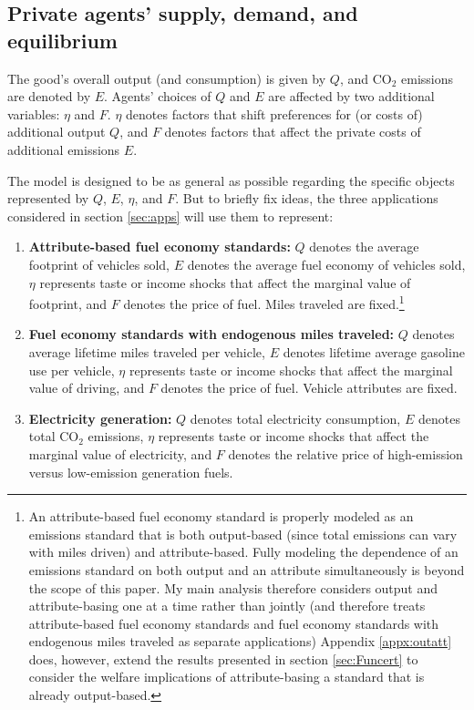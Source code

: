 \documentclass[12pt]{article}
\begin{document}
\subsection{Private agents' supply, demand, and equilibrium} \label{sec:private}

The good's overall output (and consumption) is given by $Q$, and CO$_{\text{2}}$ emissions are denoted by $E$. Agents' choices of $Q$ and $E$ are affected by two additional variables: $\eta$ and $F$. $\eta$ denotes factors that shift preferences for (or costs of) additional output $Q$, and $F$ denotes factors that affect the private costs of additional emissions $E$.

The model is designed to be as general as possible regarding the specific objects represented by $Q$, $E$, $\eta$, and $F$. But to briefly fix ideas, the three applications considered in section \ref{sec:apps} will use them to represent:
\begin{enumerate}
\item \textbf{Attribute-based fuel economy standards:} $Q$ denotes the average footprint of vehicles sold, $E$ denotes the average fuel economy of vehicles sold, $\eta$ represents taste or income shocks that affect the marginal value of footprint, and $F$ denotes the price of fuel. Miles traveled are fixed.\footnote{An attribute-based fuel economy standard is properly modeled as an emissions standard that is both output-based (since total emissions can vary with miles driven) and attribute-based. Fully modeling the dependence of an emissions standard on both output and an attribute simultaneously is beyond the scope of this paper. My main analysis therefore considers output and attribute-basing one at a time rather than jointly (and therefore treats attribute-based fuel economy standards and fuel economy standards with endogenous miles traveled as separate applications) Appendix \ref{appx:outatt} does, however, extend the results presented in section \ref{sec:Funcert} to consider the welfare implications of attribute-basing a standard that is already output-based.}
\item \textbf{Fuel economy standards with endogenous miles traveled:} $Q$ denotes average lifetime miles traveled per vehicle, $E$ denotes lifetime average gasoline use per vehicle, $\eta$ represents taste or income shocks that affect the marginal value of driving, and $F$ denotes the price of fuel. Vehicle attributes are fixed.
\item \textbf{Electricity generation:} $Q$ denotes total electricity consumption, $E$ denotes total CO$_{\text{2}}$ emissions, $\eta$ represents taste or income shocks that affect the marginal value of electricity, and $F$ denotes the relative price of high-emission versus low-emission generation fuels.
\end{enumerate}
\end{document}
